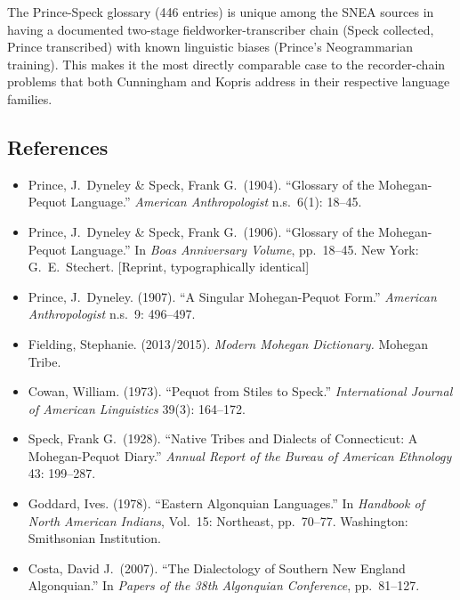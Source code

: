The Prince-Speck glossary (446 entries) is unique among the SNEA sources in
having a documented two-stage fieldworker-transcriber chain (Speck collected,
Prince transcribed) with known linguistic biases (Prince's Neogrammarian
training). This makes it the most directly comparable case to the
recorder-chain problems that both Cunningham and Kopris address in their
respective language families.

\subsection{References}

\begin{itemize}
  \item Prince, J.\ Dyneley \& Speck, Frank G.\ (1904). ``Glossary of the
    Mohegan-Pequot Language.'' \emph{American Anthropologist} n.s.\ 6(1):
    18--45.
  \item Prince, J.\ Dyneley \& Speck, Frank G.\ (1906). ``Glossary of the
    Mohegan-Pequot Language.'' In \emph{Boas Anniversary Volume}, pp.\
    18--45. New York: G.\ E.\ Stechert. [Reprint, typographically identical]
  \item Prince, J.\ Dyneley. (1907). ``A Singular Mohegan-Pequot Form.''
    \emph{American Anthropologist} n.s.\ 9: 496--497.
  \item Fielding, Stephanie. (2013/2015). \emph{Modern Mohegan Dictionary.}
    Mohegan Tribe.
  \item Cowan, William. (1973). ``Pequot from Stiles to Speck.''
    \emph{International Journal of American Linguistics} 39(3): 164--172.
  \item Speck, Frank G.\ (1928). ``Native Tribes and Dialects of Connecticut:
    A Mohegan-Pequot Diary.'' \emph{Annual Report of the Bureau of American
    Ethnology} 43: 199--287.
  \item Goddard, Ives. (1978). ``Eastern Algonquian Languages.'' In
    \emph{Handbook of North American Indians}, Vol.\ 15: Northeast, pp.\
    70--77. Washington: Smithsonian Institution.
  \item Costa, David J.\ (2007). ``The Dialectology of Southern New England
    Algonquian.'' In \emph{Papers of the 38th Algonquian Conference}, pp.\
    81--127.
\end{itemize}
